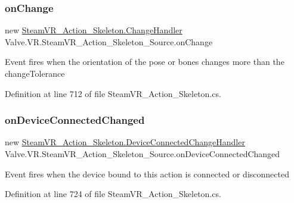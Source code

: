 \subsubsection{\texorpdfstring{onChange}{onChange}}
{\footnotesize\ttfamily new \mbox{\hyperlink{class_valve_1_1_v_r_1_1_steam_v_r___action___skeleton_a41a68545cb313ef9f47600d9e9022177}{Steam\+V\+R\+\_\+\+Action\+\_\+\+Skeleton.\+Change\+Handler}} Valve.\+V\+R.\+Steam\+V\+R\+\_\+\+Action\+\_\+\+Skeleton\+\_\+\+Source.\+on\+Change}



Event fires when the orientation of the pose or bones changes more than the change\+Tolerance 



Definition at line 712 of file Steam\+V\+R\+\_\+\+Action\+\_\+\+Skeleton.\+cs.

\mbox{\label{class_valve_1_1_v_r_1_1_steam_v_r___action___skeleton___source_ac4627b06b07b39de764adbae3b05052d}} 
\subsubsection{\texorpdfstring{onDeviceConnectedChanged}{onDeviceConnectedChanged}}
{\footnotesize\ttfamily new \mbox{\hyperlink{class_valve_1_1_v_r_1_1_steam_v_r___action___skeleton_a737d68e8f67790bf838b4f5bac3ffae1}{Steam\+V\+R\+\_\+\+Action\+\_\+\+Skeleton.\+Device\+Connected\+Change\+Handler}} Valve.\+V\+R.\+Steam\+V\+R\+\_\+\+Action\+\_\+\+Skeleton\+\_\+\+Source.\+on\+Device\+Connected\+Changed}



Event fires when the device bound to this action is connected or disconnected 



Definition at line 724 of file Steam\+V\+R\+\_\+\+Action\+\_\+\+Skeleton.\+cs.

\mbox{\label{class_valve_1_1_v_r_1_1_steam_v_r___action___skeleton___source_a618a821a496c455217e722b5e4a5541c}} 
